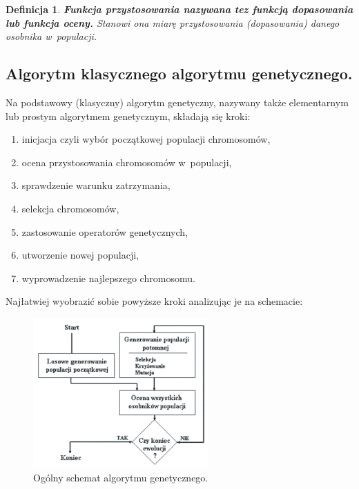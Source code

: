 \documentclass[twoside,12pt]{report}
\newtheorem{definition}{Definicja} %
\begin{document}
\vspace*{10px}

\begin{definition}
\textbf{Funkcja przystosowania nazywana tez funkcją dopasowania lub funkcja oceny.} Stanowi ona miarę przystosowania (dopasowania) danego osobnika w~populacji.
\end{definition}

\subsection{Algorytm klasycznego algorytmu genetycznego.}

Na podstawowy (klasyczny) algorytm genetyczny, nazywany także elementarnym
lub prostym algorytmem genetycznym, składają się kroki:

\begin{enumerate}
\item inicjacja czyli wybór początkowej populacji chromosomów,
\item ocena przystosowania chromosomów w~populacji,
\item sprawdzenie warunku zatrzymania,
\item selekcja chromosomów,
\item zastosowanie operatorów genetycznych,
\item utworzenie nowej populacji,
\item wyprowadzenie najlepszego chromosomu.
\end{enumerate}

Najłatwiej wyobrazić sobie powyższe kroki analizując je na schemacie:

\begin{figure}[ht]
\begin{center}
\includegraphics[width=0.6\textwidth]{img/ogolgene}
\caption{Ogólny schemat algorytmu genetycznego.}
\end{center}
\end{figure}
\end{document}
